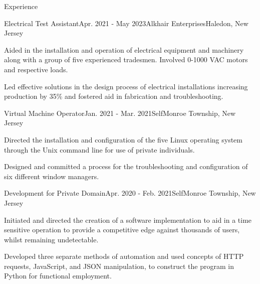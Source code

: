 \documentclass{resume}
\begin{document}
\begin{rSection}{Experience}
\begin{rSubsection}{Electrical Test Assistant}{Apr. 2021 - May 2023}{Alkhair Enterprises}{Haledon, New Jersey}
            \item Aided in the installation and operation of electrical
                equipment and machinery along with a group of five experienced
                tradesmen. Involved 0-1000 VAC motors and respective loads.
            \item Led effective solutions in the design process of electrical
                installations increasing production by 35\% and fostered aid in
                fabrication and troubleshooting.
        \end{rSubsection}
        \begin{rSubsection}{Virtual Machine Operator}{Jan. 2021 - Mar. 2021}{Self}{Monroe Township, New Jersey}
            \item Directed the installation and configuration of the five Linux
                operating system through the Unix command line for use of
                private individuals.
            \item Designed and committed a process for the troubleshooting and
                configuration of six different window managers.
        \end{rSubsection}
        \begin{rSubsection}{Development for Private Domain}{Apr. 2020 - Feb. 2021}{Self}{Monroe Township, New Jersey}
            \item Initiated and directed the creation of a software
                implementation to aid in a time sensitive operation to provide
                a competitive edge against thousands of users, whilst remaining
                undetectable.
            \item Developed three separate methods of automation and used
                concepts of HTTP requests, JavaScript, and JSON manipulation,
                to construct the program in Python for functional employment.
        \end{rSubsection}
    \end{rSection}
\end{document}
